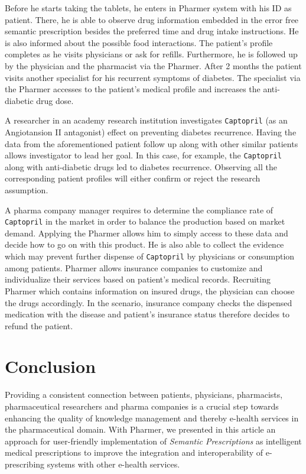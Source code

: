 \documentclass[journal]{IEEEtran}
\begin{document}
Before he starts taking the tablets, he enters in Pharmer system with his ID as patient.
There, he is able to observe drug information embedded in the error free semantic prescription besides the preferred time and drug intake instructions.
He is also informed about the possible food interactions.
The patient's profile completes as he visits physicians or ask for refills.
Furthermore, he is followed up by the physician and the pharmacist via the Pharmer.
After 2 months the patient visits another specialist for his recurrent symptoms of diabetes.
The specialist via the Pharmer accesses to the patient's medical profile and increases the anti-diabetic drug dose.

A researcher in an academy research institution investigates \texttt{Captopril} (as an Angiotansion II antagonist) effect on preventing diabetes recurrence.
Having the data from the aforementioned patient follow up along with other similar patients allows investigator to lead her goal.
In this case, for example, the \texttt{Captopril} along with anti-diabetic drugs led to diabetes recurrence.
Observing all the corresponding patient profiles will either confirm or reject the research assumption.

 A pharma company manager requires to determine the compliance rate of \texttt{Captopril} in the market in order to balance the production based on market demand.
 Applying the Pharmer allows him to simply access to these data and decide how to go on with this product.
 He is also able to collect the evidence which may prevent further dispense of \texttt{Captopril} by physicians or consumption among patients.
 Pharmer allows insurance companies to customize and individualize their services based on patient's medical records. Recruiting Pharmer which contains information on insured drugs, the physician can choose the drugs accordingly.
 In the scenario, insurance company checks the dispensed medication with the disease and patient's insurance status therefore decides to refund the patient.

\section{Conclusion}
\label{sec:conclusion}

Providing a consistent connection between patients, physicians, pharmacists, pharmaceutical researchers and pharma companies is a crucial step towards enhancing the quality of knowledge management and thereby e-health services in the pharmaceutical domain.
With Pharmer, we presented in this article an approach for user-friendly implementation of \emph{Semantic Prescriptions} as intelligent medical prescriptions to improve the integration and interoperability of e-prescribing systems with other e-health services.
\end{document}

